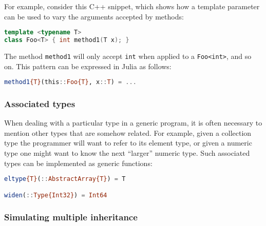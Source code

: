 For example, consider this C++ snippet, which shows how a template
parameter can be used to vary the arguments accepted by methods:

\begin{singlespace}
\begin{lstlisting}[language=c++,style=ttcode]
template <typename T>
class Foo<T> { int method1(T x); }
\end{lstlisting}
\end{singlespace}

\noindent
The method \texttt{method1} will only accept \texttt{int} when applied to
a \texttt{Foo<int>}, and so on.
This pattern can be expressed in Julia as follows:

\begin{singlespace}
\begin{lstlisting}[language=julia]
method1{T}(this::Foo{T}, x::T) = ...
\end{lstlisting}
\end{singlespace}



\subsubsection{Associated types}

When dealing with a particular type in a generic program, it is often
necessary to mention other types that are somehow related.
For example, given a collection type the programmer will want to
refer to its element type, or given a numeric type one might want to
know the next ``larger'' numeric type.
Such associated types can be implemented as generic functions:

\begin{singlespace}
\begin{lstlisting}[language=julia]
eltype{T}(::AbstractArray{T}) = T

widen(::Type{Int32}) = Int64
\end{lstlisting}
\end{singlespace}

\subsubsection{Simulating multiple inheritance}

